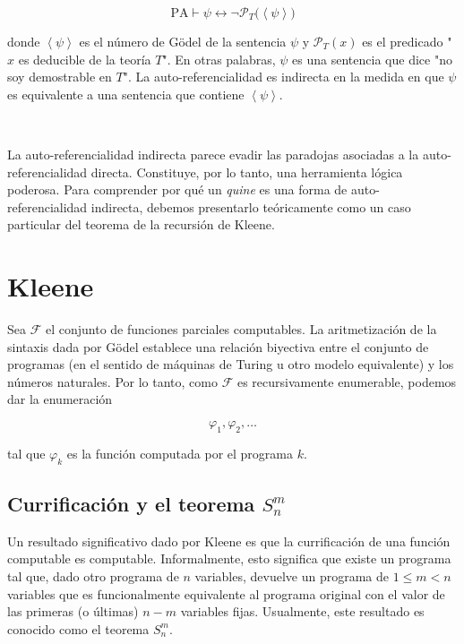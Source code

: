 \documentclass[a4paper, 12pt]{article}
\begin{document}
\begin{equation*}
  \text{PA} \vdash \psi \leftrightarrow \neg\mathcal{P}_T\big( \left< \psi \right> \big)
\end{equation*}

donde $\left<\psi \right>$ es el número de Gödel de la sentencia $\psi$ y
$\mathcal{P}_T(x)$ es el predicado "$x$ es deducible de la teoría $T$". En otras
palabras, $\psi$ es una sentencia que dice "no soy demostrable en $T$". La
auto-referencialidad es indirecta en la medida en que $\psi$ es equivalente a
una sentencia que contiene $\left<\psi \right>$.

~ 

La auto-referencialidad indirecta parece evadir las paradojas asociadas a la
auto-referencialidad directa. Constituye, por lo tanto, una herramienta lógica
poderosa. Para comprender por qué un \textit{quine} es una forma de
auto-referencialidad indirecta, debemos presentarlo teóricamente como un caso
particular del teorema de la recursión de Kleene.

\section{Kleene}

Sea $\mathcal{F}$ el conjunto de funciones parciales computables. La
aritmetización de la sintaxis dada por Gödel establece una relación biyectiva
entre el conjunto de programas (en el sentido de máquinas de Turing u otro modelo equivalente)
y los números naturales. Por lo tanto, como $\mathcal{F}$ es recursivamente
enumerable, podemos dar la enumeración 

\begin{equation*}
  \varphi_1, \varphi_2, \ldots
\end{equation*}

tal que $\varphi_k$ es la función computada por el programa $k$. 

\subsection{Currificación y el teorema $S_n^m$}

Un resultado significativo dado por Kleene es que la currificación de una
función computable es computable. Informalmente, esto significa que existe un
programa tal que, dado otro programa de $n$ variables, devuelve un programa de $1
\leq m < n$ variables que es funcionalmente equivalente al programa original
con el valor de las primeras (o últimas) $n - m$ variables fijas. Usualmente,
este resultado es conocido como el teorema $S_n^m$.
\end{document}
